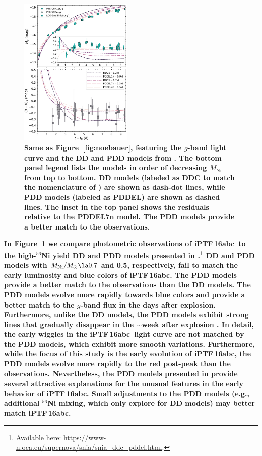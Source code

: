 \documentclass[twocolumn]{aastex61}
\newcommand{\abc}{iPTF\,16abc}
\begin{document}
\begin{figure}[]
  \centering
  \includegraphics[width=0.48\textwidth]{compare_Dessart.pdf}
  \caption{
  \textbf{Same as Figure~\ref{fig:noebauer}, featuring the $g$-band light
  curve and the DD and PDD models from \citet{2014MNRAS.441..532D}. The bottom
  panel legend lists the models in order of decreasing $M_\mathrm{Ni}$ from
  top to bottom. DD models (labeled as DDC to match the nomenclature of
  \citealt{2014MNRAS.441..532D}) are shown as dash-dot lines, while PDD models
  (labeled as PDDEL) are shown as dashed lines. The inset in the top panel
  shows the residuals relative to the PDDEL7n model. The PDD models provide a
  better match to the observations.} }
  \label{fig:dessart} 
\end{figure}

\textbf{In Figure~\ref{fig:dessart} we compare photometric observations of
\abc\ to the high-$^{56}$Ni yield DD and PDD models presented in
\citet{2014MNRAS.441..532D}.\footnote{Available here:
\url{https://www-n.oca.eu/supernova/snia/snia_ddc_pddel.html}.} DD and PDD
models with $M_\mathrm{Ni}/M_\odot \la 0.7$ and 0.5, respectively, fail to
match the early luminosity and blue colors of \abc. The PDD models provide a
better match to the observations than the DD models. The PDD models evolve
more rapidly towards blue colors and provide a better match to the $g$-band
flux in the days after explosion. Furthermore, unlike the DD models, the PDD
models exhibit strong  lines that gradually disappear in the
$\sim$week after explosion \citep{2014MNRAS.441..532D}. In detail, the early
wiggles in the \abc\ light curve are not matched by the PDD models, which
exhibit more smooth variations. Furthermore, while the focus of this study is
the early evolution of \abc, the PDD models evolve more rapidly to the red
post-peak than the observations. Nevertheless, the PDD models presented in
\citet{2014MNRAS.441..532D} provide several attractive explanations for the
unusual features in the early behavior of \abc. Small adjustments to the PDD
models (e.g., additional $^{56}$Ni mixing, which
\citeauthor{2014MNRAS.441..532D} only explore for DD models) may better match
\abc.}
\end{document}

